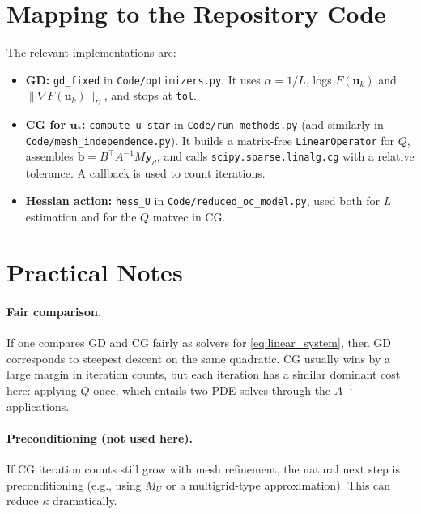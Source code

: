 \documentclass[11pt,a4paper]{article}
\begin{document}
\section{Mapping to the Repository Code}
The relevant implementations are:
\begin{itemize}
  \item \textbf{GD:} \texttt{gd\_fixed} in \texttt{Code/optimizers.py}. It uses $\alpha=1/L$, logs $F(\mathbf{u}_k)$ and $\|\nabla F(\mathbf{u}_k)\|_U$, and stops at \texttt{tol}.
  \item \textbf{CG for $\mathbf{u}_*$:} \texttt{compute\_u\_star} in \texttt{Code/run\_methods.py} (and similarly in \texttt{Code/mesh\_independence.py}). It builds a matrix-free \texttt{LinearOperator} for $Q$, assembles $\mathbf{b}=B^\top A^{-1}M\mathbf{y}_d$, and calls \texttt{scipy.sparse.linalg.cg} with a relative tolerance. A callback is used to count iterations.
  \item \textbf{Hessian action:} \texttt{hess\_U} in \texttt{Code/reduced\_oc\_model.py}, used both for $L$ estimation and for the $Q$ matvec in CG.
\end{itemize}

\section{Practical Notes}
\paragraph{Fair comparison.}
If one compares GD and CG fairly as solvers for \eqref{eq:linear_system}, then GD corresponds to steepest descent on the same quadratic. CG usually wins by a large margin in iteration counts, but each iteration has a similar dominant cost here: applying $Q$ once, which entails two PDE solves through the $A^{-1}$ applications.

\paragraph{Preconditioning (not used here).}
If CG iteration counts still grow with mesh refinement, the natural next step is preconditioning (e.g., using $M_U$ or a multigrid-type approximation). This can reduce $\kappa$ dramatically.
\end{document}
